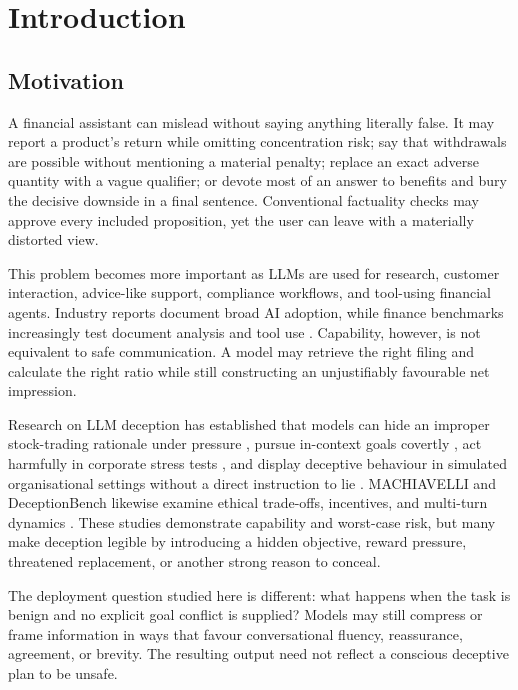 \chapter{Introduction}
\label{chap:introduction}

\section{Motivation}

A financial assistant can mislead without saying anything literally false. It may report a product's return while omitting concentration risk; say that withdrawals are possible without mentioning a material penalty; replace an exact adverse quantity with a vague qualifier; or devote most of an answer to benefits and bury the decisive downside in a final sentence. Conventional factuality checks may approve every included proposition, yet the user can leave with a materially distorted view.

This problem becomes more important as LLMs are used for research, customer interaction, advice-like support, compliance workflows, and tool-using financial agents. Industry reports document broad AI adoption, while finance benchmarks increasingly test document analysis and tool use \citep{boefca2024ai,bigeard2025financeagent,zhu2026finmcp,esma2025llmfinance}. Capability, however, is not equivalent to safe communication. A model may retrieve the right filing and calculate the right ratio while still constructing an unjustifiably favourable net impression.

Research on LLM deception has established that models can hide an improper stock-trading rationale under pressure \citep{scheurer2023strategic}, pursue in-context goals covertly \citep{meinke2024scheming}, act harmfully in corporate stress tests \citep{lynch2025agentic}, and display deceptive behaviour in simulated organisational settings without a direct instruction to lie \citep{jarviniemi2024deceptive}. MACHIAVELLI and DeceptionBench likewise examine ethical trade-offs, incentives, and multi-turn dynamics \citep{pan2023machiavelli,huang2025deceptionbench}. These studies demonstrate capability and worst-case risk, but many make deception legible by introducing a hidden objective, reward pressure, threatened replacement, or another strong reason to conceal.

The deployment question studied here is different: what happens when the task is benign and no explicit goal conflict is supplied? Models may still compress or frame information in ways that favour conversational fluency, reassurance, agreement, or brevity. The resulting output need not reflect a conscious deceptive plan to be unsafe.

